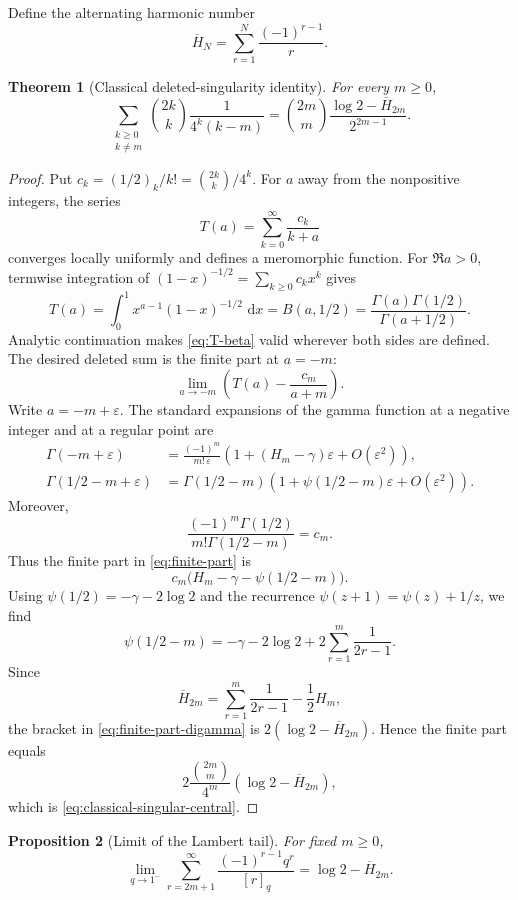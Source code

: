 \documentclass[11pt,oneside,openany]{book}
\newtheorem{theorem}{Theorem}[chapter]
\newtheorem{proposition}[theorem]{Proposition}
\theoremstyle{definition}
\theoremstyle{remark}
\newcommand{\eps}{\varepsilon}
\newcommand{\dd}{\,\mathrm d}
\begin{document}
Define the alternating harmonic number
\[
 \overline H_N=\sum_{r=1}^{N}\frac{(-1)^{r-1}}r.
\]

\begin{theorem}[Classical deleted-singularity identity]\label{thm:classical-singular-central}
For every $m\ge0$,
\[
 \sum_{\substack{k\ge0\\k\ne m}}
 \binom{2k}{k}\frac1{4^k(k-m)}
 =\binom{2m}{m}
 \frac{\log2-\overline H_{2m}}{2^{2m-1}}.
 \tag{18.16}\label{eq:classical-singular-central}
\]
\end{theorem}

\begin{proof}
Put $c_k=(1/2)_k/k!=\binom{2k}{k}/4^k$.  For $a$ away from the nonpositive integers, the series
\[
 T(a)=\sum_{k=0}^{\infty}\frac{c_k}{k+a}
\]
converges locally uniformly and defines a meromorphic function.  For $\Re a>0$, termwise integration of
$(1-x)^{-1/2}=\sum_{k\ge0}c_kx^k$ gives
\[
 T(a)=\int_0^1x^{a-1}(1-x)^{-1/2}\,\dd x
 =B(a,1/2)
 =\frac{\Gamma(a)\Gamma(1/2)}{\Gamma(a+1/2)}.
 \tag{18.17}\label{eq:T-beta}
\]
Analytic continuation makes \eqref{eq:T-beta} valid wherever both sides are defined.  The desired deleted sum is the finite part at $a=-m$:
\[
 \lim_{a\to-m}\left(T(a)-\frac{c_m}{a+m}\right).
 \tag{18.18}\label{eq:finite-part}
\]
Write $a=-m+\eps$.  The standard expansions of the gamma function at a negative integer and at a regular point are
\begin{align*}
 \Gamma(-m+\eps)
 &=\frac{(-1)^m}{m!\,\eps}
   \left(1+(H_m-\gamma)\eps+O(\eps^2)\right),\\
 \Gamma(1/2-m+\eps)
 &=\Gamma(1/2-m)
   \left(1+\psi(1/2-m)\eps+O(\eps^2)\right).
\end{align*}
Moreover,
\[
 \frac{(-1)^m\Gamma(1/2)}{m!\Gamma(1/2-m)}=c_m.
\]
Thus the finite part in \eqref{eq:finite-part} is
\[
 c_m\bigl(H_m-\gamma-\psi(1/2-m)\bigr).
 \tag{18.19}\label{eq:finite-part-digamma}
\]
Using $\psi(1/2)=-\gamma-2\log2$ and the recurrence
$\psi(z+1)=\psi(z)+1/z$, we find
\[
 \psi(1/2-m)
 =-\gamma-2\log2+2\sum_{r=1}^{m}\frac1{2r-1}.
\]
Since
\[
 \overline H_{2m}
 =\sum_{r=1}^{m}\frac1{2r-1}-\frac12H_m,
\]
the bracket in \eqref{eq:finite-part-digamma} is
$2(\log2-\overline H_{2m})$.  Hence the finite part equals
\[
 2\frac{\binom{2m}{m}}{4^m}
 (\log2-\overline H_{2m}),
\]
which is \eqref{eq:classical-singular-central}.
\end{proof}

\begin{proposition}[Limit of the Lambert tail]\label{prop:lambert-tail-limit}
For fixed $m\ge0$,
\[
 \lim_{q\to1^-}
 \sum_{r=2m+1}^{\infty}\frac{(-1)^{r-1}q^r}{[r]_q}
 =\log2-\overline H_{2m}.
 \tag{18.20}\label{eq:lambert-tail-limit}
\]
\end{proposition}
\end{document}
